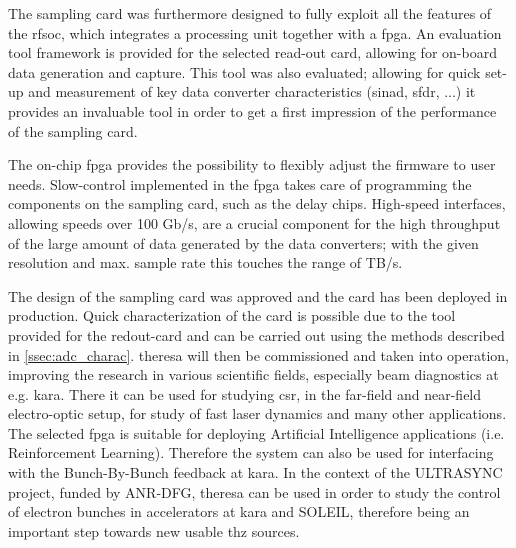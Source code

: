 The sampling card was furthermore designed to fully exploit all the features of the \gls{rfsoc}, which integrates a processing unit together with a \gls{fpga}.
An evaluation tool framework is provided for the selected read-out card, allowing for on-board data generation and capture.
This tool was also evaluated; allowing for quick set-up and measurement of key data converter characteristics (\gls{sinad}, \gls{sfdr}, ...) it provides an invaluable tool in order to get a first impression of the performance of the sampling card.

The on-chip \gls{fpga} provides the possibility to flexibly adjust the firmware to user needs. 
Slow-control implemented in the \gls{fpga} takes care of programming the components on the sampling card, such as the delay chips.
High-speed interfaces, allowing speeds over 100 Gb/s, are a crucial component for the high throughput of the large amount of data generated by the data converters; with the given resolution and max. sample rate this touches the range of TB/s.


The design of the sampling card was approved and the card has been deployed in production.
Quick characterization of the card is possible due to the tool provided for the redout-card and can be carried out using the methods described in \autoref{ssec:adc_charac}.
\gls{theresa} will then be commissioned and taken into operation, improving the research in various scientific fields, especially beam diagnostics at e.g. \gls{kara}. 
There it can be used for studying \gls{csr}, in the far-field and near-field electro-optic setup, for study of fast laser dynamics and many other applications.
The selected \gls{fpga} is suitable for deploying Artificial Intelligence applications (i.e. Reinforcement Learning).
Therefore the system can also be used for interfacing with the Bunch-By-Bunch feedback at \gls{kara}.
In the context of the ULTRASYNC project, funded by ANR-DFG, \gls{theresa} can be used in order to study the control of electron bunches in accelerators at \gls{kara} and SOLEIL, therefore being an important step towards new usable \gls{thz} sources. 
 

